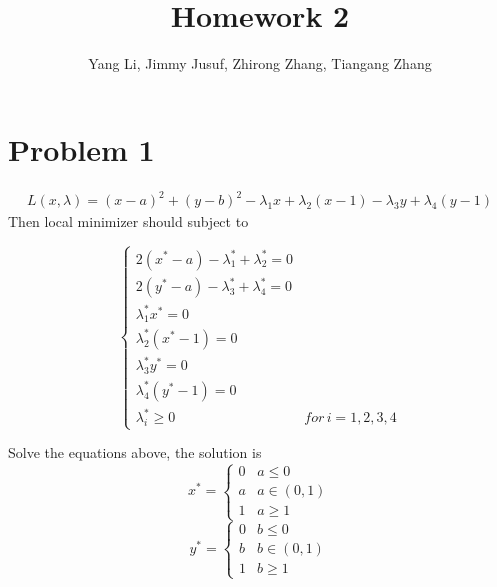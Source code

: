 \documentclass[a4paper]{article}
\title{Homework 2}
\author{Yang Li, Jimmy Jusuf, Zhirong Zhang, Tiangang Zhang }
\begin{document}
\maketitle


\section{Problem 1}
\begin{eqnarray*}
L(x,\lambda)=(x-a)^2+(y-b)^2-\lambda_1 x+\lambda_2 (x-1)-\lambda_3 y +\lambda_4 (y-1)
\end{eqnarray*}
Then local minimizer should subject to

\begin{equation}  
\left\{  
             \begin{array}{ll}
             2(x^*-a)-\lambda_1^*+\lambda_2^*=0\\  
             2(y^*-a)-\lambda_3^*+\lambda_4^*=0\\
             \lambda_1^* x^*=0\\
             \lambda_2^*(x^*-1)=0\\
             \lambda_3^* y^*=0\\
             \lambda_4^*(y^*-1)=0\\
             \lambda_i^* \geq 0 & for \,  i=1,2,3,4
             \end{array}  
\right.  
\end{equation}  

Solve the equations above, the solution is
\begin{equation}  
x^*=
\left\{  
             \begin{array}{ll}
             0 & a\leq 0\\
             a & a \in (0,1) \\
             1 & a \geq 1
             \end{array}  
\right.  
\end{equation} 
\begin{equation}  
y^*=
\left\{  
             \begin{array}{ll}
             0 & b\leq 0\\
             b & b \in (0,1) \\
             1 & b \geq 1
             \end{array}  
\right.  
\end{equation}  
\end{document}

